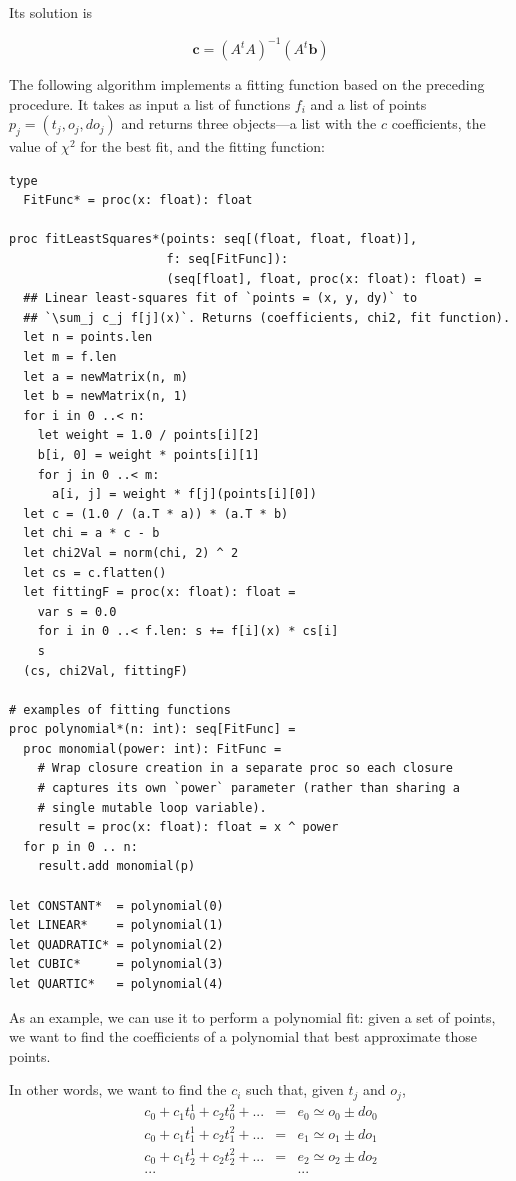 \documentclass[justified, sixbynine]{tufte-book}
\def\ft{\small\tt}
\theoremstyle{plain}%
\newtheorem * {corollary}{Corollary}
\theoremstyle{definition}
\theoremstyle{remark}
\newtheorem * {remark}{Remark}
\newtheorem * {note}{Note}
\begin{document}
\begin{fullwidth}
Its solution is

\begin{equation}
\mathbf{c} = (A^t A)^{-1} (A^t \mathbf{b})
\end{equation}

The following algorithm implements a fitting function based on the preceding procedure. It takes as input a list of functions $f_i$ and a list of points $p_j=(t_j, o_j, do_j)$ and returns three objects---a list with the $c$ coefficients, the value of $\chi^2$ for the best fit, and the fitting function:

\begin{lstlisting}[caption={in file: {\ft nlib/fitting.nim}}]
type
  FitFunc* = proc(x: float): float

proc fitLeastSquares*(points: seq[(float, float, float)],
                      f: seq[FitFunc]):
                      (seq[float], float, proc(x: float): float) =
  ## Linear least-squares fit of `points = (x, y, dy)` to
  ## `\sum_j c_j f[j](x)`. Returns (coefficients, chi2, fit function).
  let n = points.len
  let m = f.len
  let a = newMatrix(n, m)
  let b = newMatrix(n, 1)
  for i in 0 ..< n:
    let weight = 1.0 / points[i][2]
    b[i, 0] = weight * points[i][1]
    for j in 0 ..< m:
      a[i, j] = weight * f[j](points[i][0])
  let c = (1.0 / (a.T * a)) * (a.T * b)
  let chi = a * c - b
  let chi2Val = norm(chi, 2) ^ 2
  let cs = c.flatten()
  let fittingF = proc(x: float): float =
    var s = 0.0
    for i in 0 ..< f.len: s += f[i](x) * cs[i]
    s
  (cs, chi2Val, fittingF)

# examples of fitting functions
proc polynomial*(n: int): seq[FitFunc] =
  proc monomial(power: int): FitFunc =
    # Wrap closure creation in a separate proc so each closure
    # captures its own `power` parameter (rather than sharing a
    # single mutable loop variable).
    result = proc(x: float): float = x ^ power
  for p in 0 .. n:
    result.add monomial(p)

let CONSTANT*  = polynomial(0)
let LINEAR*    = polynomial(1)
let QUADRATIC* = polynomial(2)
let CUBIC*     = polynomial(3)
let QUARTIC*   = polynomial(4)
\end{lstlisting}

As an example, we can use it to perform a polynomial fit: given a set of points, we want to find the coefficients of a polynomial that best approximate those points.

In other words, we want to find the $c_i$ such that, given $t_j$ and $o_j$, 
\begin{eqnarray}
c_0  + c_1 t_0^{1} + c_2 t_0^{2} +  ... & = & e_0 \simeq o_0 \pm do_0 \\
c_0  + c_1 t_1^{1} + c_2 t_1^{2} +  ... & = & e_1 \simeq o_1 \pm do_1\\
c_0  + c_1 t_2^{1} + c_2 t_2^{2} +  ... & = & e_2 \simeq o_2 \pm do_2\\
... &  &... \\
\end{eqnarray}


\end{fullwidth}
\end{document}
